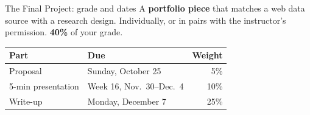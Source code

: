 \documentclass[9pt,aspectratio=169]{beamer}
\begin{document}
\begin{frame}{The Final Project: grade and dates}
    A \textbf{portfolio piece} that matches a web data source with a research design. Individually, or in pairs with the instructor's permission. \textbf{40\%} of your grade.

    \medskip

    \begin{center}
    \begin{tabular}{llr}
        \toprule
        \textbf{Part} & \textbf{Due} & \textbf{Weight} \\
        \midrule
        Proposal & Sunday, October 25 & 5\% \\
        5-min presentation & Week 16, Nov.~30--Dec.~4 & 10\% \\
        Write-up & Monday, December 7 & 25\% \\
        \bottomrule
    \end{tabular}
    \end{center}
\end{frame}
\end{document}
